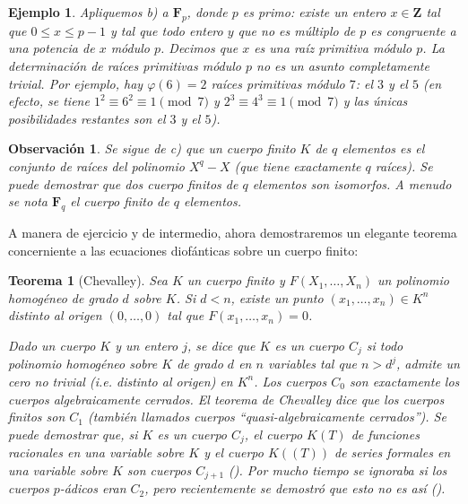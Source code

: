\documentclass[oneside,bibtotoc,leqno,spanish]{amsbook}
\newcommand{\ZZ}{\mathbf{Z}}
\newcommand{\FF}{\mathbf{F}}
\numberwithin{equation}{section}
\newenvironment{comm}%
	{\begin{trivlist}\item\small\itshape}
	{\end{trivlist}}
\theoremstyle{defi}
\theoremstyle{note}
\newtheorem{theorem}{Teorema}
\theoremstyle{rem}
\newtheorem*{example*}{Ejemplo}
\newtheorem*{remark*}{Observaci\'on}
\numberwithin{theorem}{section}
\numberwithin{proposition}{section}
\numberwithin{definition}{section}
\numberwithin{lemma}{section}
\numberwithin{corollary}{section}
\numberwithin{example}{section}
\numberwithin{footnote}{section}%
\begin{document}
\begin{example*}
Apliquemos b) a $\FF_{p}$, donde $p$ es primo: existe un entero $x\in\ZZ$ tal que $0\leq x\leq p-1$ y tal
que todo entero $y$ que no es m\'ultiplo de $p$ es congruente a una potencia de $x$ m\'odulo $p$. Decimos
que $x$ es {\em una ra\'iz primitiva m\'odulo $p$.} La determinaci\'on de ra\'ices primitivas m\'odulo
$p$ no es un asunto completamente trivial. Por ejemplo, hay $\varphi(6) = 2$ ra\'ices primitivas m\'odulo $7$:
el $3$ y el $5$ (en efecto, se tiene $1^{2}\equiv 6^{2}\equiv 1\pmod 7$ y $2^{3}\equiv 4^{3}\equiv 1\pmod 7$
y las \'unicas posibilidades restantes son el $3$ y el $5$).
\end{example*}

\begin{remark*}
Se sigue de c) que un cuerpo finito $K$ de $q$ elementos es el conjunto de ra\'ices del polinomio $X^{q}-X$
(que tiene exactamente $q$ ra\'ices). Se puede demostrar que dos cuerpo finitos de $q$ elementos son isomorfos.
A menudo se nota $\FF_{q}$ el cuerpo finito de $q$ elementos.
\end{remark*}

A manera de ejercicio y de intermedio, ahora demostraremos un elegante teorema concerniente a las
ecuaciones diof\'anticas sobre un cuerpo finito:

\begin{theorem}[Chevalley]\label{teo1.7.2}
Sea $K$ un cuerpo finito y $F(X_{1},\dots,X_{n})$ un polinomio homog\'eneo de grado $d$ sobre $K$.
Si $d < n$, existe un punto $(x_{1},\dots,x_{n})\in K^{n}$ distinto al origen $(0,\dots,0)$ tal que
$F(x_{1},\dots,x_{n}) = 0$.
\end{theorem}

\begin{comm}
Dado un cuerpo $K$ y un entero $j$, se dice que $K$ es un {\em cuerpo} $C_{j}$ si todo polinomio
homog\'eneo sobre $K$ de grado $d$ en $n$ variables {\em tal que} $n > d^{j}$, admite un cero no
trivial (i.e. distinto al origen) en $K^{n}$. Los cuerpos $C_{0}$ son exactamente los cuerpos algebraicamente
cerrados. El teorema de Chevalley dice que los cuerpos finitos son $C_{1}$ (tambi\'en llamados
cuerpos ``quasi-algebraicamente cerrados''). Se puede demostrar que, si $K$ es un cuerpo $C_{j}$, el
cuerpo $K(T)$ de funciones racionales en una variable sobre $K$ y el cuerpo $K((T))$ de series formales
en una variable sobre $K$ son cuerpos $C_{j+1}$ (\cite{Lang}). Por mucho tiempo se ignoraba si los
cuerpos $p$-\'adicos eran $C_{2}$, pero recientemente se demostr\'o que esto no es as\'i (\cite{Terjanian}).
\end{comm}
\end{document}

